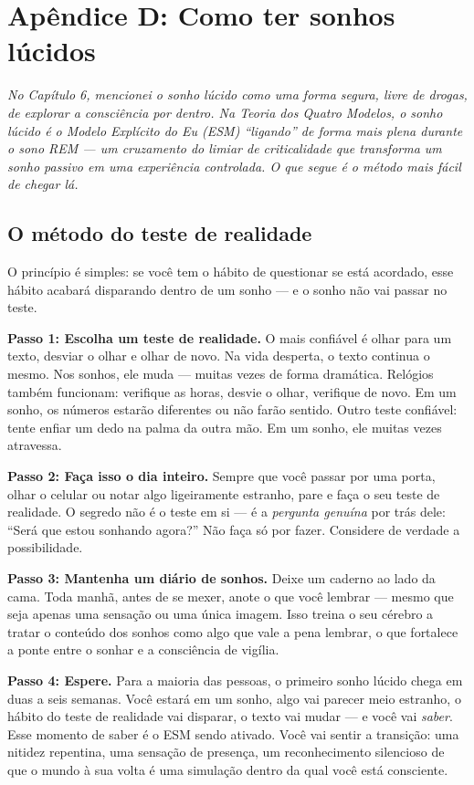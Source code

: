 \documentclass[11pt, twoside, openright]{book}
\begin{document}
\chapter*{Apêndice D: Como ter sonhos lúcidos}

\textit{No Capítulo 6, mencionei o sonho lúcido como uma forma segura, livre de drogas, de explorar a consciência por dentro. Na Teoria dos Quatro Modelos, o sonho lúcido é o Modelo Explícito do Eu (ESM) ``ligando'' de forma mais plena durante o sono REM --- um cruzamento do limiar de criticalidade que transforma um sonho passivo em uma experiência controlada. O que segue é o método mais fácil de chegar lá.}

\section*{O método do teste de realidade}

O princípio é simples: se você tem o hábito de questionar se está acordado, esse hábito acabará disparando dentro de um sonho --- e o sonho não vai passar no teste.

\textbf{Passo 1: Escolha um teste de realidade.} O mais confiável é olhar para um texto, desviar o olhar e olhar de novo. Na vida desperta, o texto continua o mesmo. Nos sonhos, ele muda --- muitas vezes de forma dramática. Relógios também funcionam: verifique as horas, desvie o olhar, verifique de novo. Em um sonho, os números estarão diferentes ou não farão sentido. Outro teste confiável: tente enfiar um dedo na palma da outra mão. Em um sonho, ele muitas vezes atravessa.

\textbf{Passo 2: Faça isso o dia inteiro.} Sempre que você passar por uma porta, olhar o celular ou notar algo ligeiramente estranho, pare e faça o seu teste de realidade. O segredo não é o teste em si --- é a \textit{pergunta genuína} por trás dele: ``Será que estou sonhando agora?'' Não faça só por fazer. Considere de verdade a possibilidade.

\textbf{Passo 3: Mantenha um diário de sonhos.} Deixe um caderno ao lado da cama. Toda manhã, antes de se mexer, anote o que você lembrar --- mesmo que seja apenas uma sensação ou uma única imagem. Isso treina o seu cérebro a tratar o conteúdo dos sonhos como algo que vale a pena lembrar, o que fortalece a ponte entre o sonhar e a consciência de vigília.

\textbf{Passo 4: Espere.} Para a maioria das pessoas, o primeiro sonho lúcido chega em duas a seis semanas. Você estará em um sonho, algo vai parecer meio estranho, o hábito do teste de realidade vai disparar, o texto vai mudar --- e você vai \textit{saber}. Esse momento de saber é o ESM sendo ativado. Você vai sentir a transição: uma nitidez repentina, uma sensação de presença, um reconhecimento silencioso de que o mundo à sua volta é uma simulação dentro da qual você está consciente.
\end{document}
